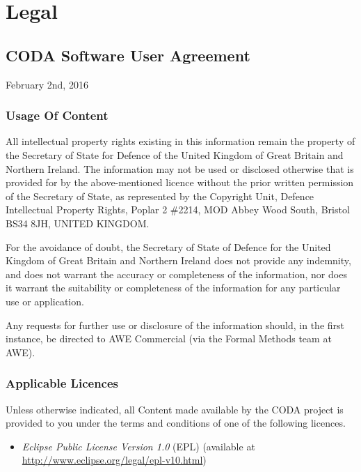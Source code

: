 \section{Legal}
\label{sec:simulator2-legal}

\subsection{CODA Software User Agreement}
\label{sec:simulator2-user-agreement}

February 2nd, 2016

\subsubsection{Usage Of Content}
\label{sec:usage-content}

All intellectual property rights existing in this information remain
the property of the Secretary of State for Defence of the United
Kingdom of Great Britain and Northern Ireland. The information may not
be used or disclosed otherwise that is provided for by the
above-mentioned licence without the prior written permission of the
Secretary of State, as represented by the Copyright Unit, Defence
Intellectual Property Rights, Poplar 2 \#2214, MOD Abbey Wood South,
Bristol BS34 8JH, UNITED KINGDOM.

For the avoidance of doubt, the Secretary of State of Defence for the
United Kingdom of Great Britain and Northern Ireland does not provide
any indemnity, and does not warrant the accuracy or completeness of
the information, nor does it warrant the suitability or completeness
of the information for any particular use or application.

Any requests for further use or disclosure of the information should,
in the first instance, be directed to AWE Commercial (via the Formal
Methods team at AWE).

\subsubsection{Applicable Licences}
\label{sec:component_diagrams-applicable-licences}

Unless otherwise indicated, all Content made available by the CODA
project is provided to you under the terms and conditions of one of
the following licences.

\begin{itemize}
\item \emph{Eclipse Public License Version 1.0} (EPL) (available at 
   \url{http://www.eclipse.org/legal/epl-v10.html})
\end{itemize}

